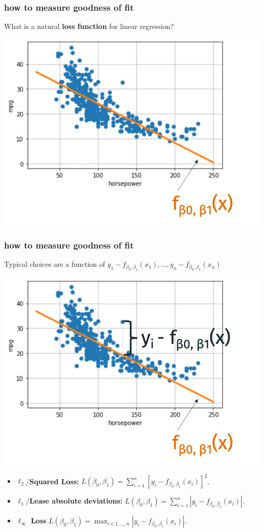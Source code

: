 \documentclass[handout,compress]{beamer}
\begin{document}
\begin{frame}
	\frametitle{how to measure goodness of fit}
	What is a natural \textbf{loss function} for linear regression?
	\begin{center}
	\includegraphics[width=.5\textwidth]{visualizing_fit.png}
	\end{center}
\end{frame}

\begin{frame}
	\frametitle{how to measure goodness of fit}
	\small
	Typical choices are a function of $y_1 - f_{\beta_0,\beta_1}(x_1), \ldots, y_n - f_{\beta_0,\beta_1}(x_n) $
	\begin{center}
		\includegraphics[width=.5\textwidth]{visualizing_loss.png}
	\end{center}
	\begin{itemize}
		\item $\ell_2$/\textbf{Squared Loss:} $L(\beta_0,\beta_1) = \sum_{i=1}^n \left[y_i - f_{\beta_0,\beta_1}(x_i)\right]^2$.
		\vspace{.5em}
		\item $\ell_1$/\textbf{Lease absolute deviations:} $L(\beta_0,\beta_1) = \sum_{i=1}^n \left|y_i - f_{\beta_0,\beta_1}(x_i)\right|$.
		\vspace{.5em}
		\item $\ell_\infty$ \textbf{Loss } $L(\beta_0,\beta_1) = \max_{i\in 1,\ldots, n} \left|y_i - f_{\beta_0,\beta_1}(x_i)\right|$.
	\end{itemize}
\end{frame}
\end{document}

